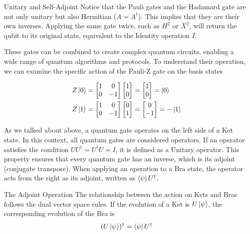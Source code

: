 \documentclass[11pt, letterpaper]{article}
\begin{document}
\begin{SBUBox}{Unitary and Self-Adjoint}
Notice that the Pauli gates and the Hadamard gate are not only unitary but also Hermitian ($A = A^\dagger$). This implies that they are their own inverses. Applying the same gate twice, such as $H^2$ or $X^2$, will return the qubit to its original state, equivalent to the Identity operation $I$.
\end{SBUBox}

These gates can be combined to create complex quantum circuits, enabling a wide range of quantum algorithms and protocols. To understand their operation, we can examine the specific action of the Pauli-Z gate on the basis states

\begin{equation}
  \begin{aligned}
  Z \ket{0} &= \begin{bmatrix} 1 & 0 \\ 0 & -1 \end{bmatrix} \begin{bmatrix} 1 \\ 0 \end{bmatrix} = \begin{bmatrix} 1 \\ 0 \end{bmatrix} = \ket{0} \\
  Z \ket{1} &= \begin{bmatrix} 1 & 0 \\ 0 & -1 \end{bmatrix} \begin{bmatrix} 0 \\ 1 \end{bmatrix} = \begin{bmatrix} 0 \\ -1 \end{bmatrix} = -\ket{1}
  \end{aligned}
\end{equation}

As we talked about above, a quantum gate operates on the left side of a Ket state. In this context, all quantum gates are considered operators. If an operator satisfies the condition $U U^\dagger = U^\dagger U = I$, it is defined as a Unitary operator. This property ensures that every quantum gate has an inverse, which is its adjoint (conjugate transpose). When applying an operation to a Bra state, the operator acts from the right as its adjoint, written as $\bra{\psi} U^\dagger$.

\begin{SBUBox}{The Adjoint Operation}
The relationship between the action on Kets and Bras follows the dual vector space rules. If the evolution of a Ket is $U\ket{\psi}$, the corresponding evolution of the Bra is
\begin{equation*}
  (U\ket{\psi})^\dagger = \bra{\psi}U^\dagger
\end{equation*}
\end{SBUBox}
\end{document}
